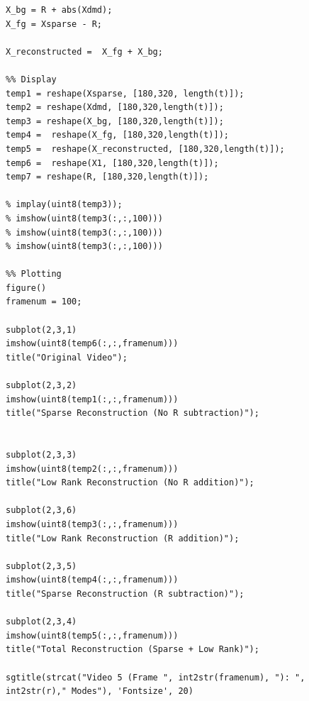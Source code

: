 \documentclass{article}
\begin{document}
\begin{lstlisting}[style=Matlab-editor]
X_bg = R + abs(Xdmd);
X_fg = Xsparse - R;

X_reconstructed =  X_fg + X_bg;

%% Display
temp1 = reshape(Xsparse, [180,320, length(t)]);
temp2 = reshape(Xdmd, [180,320,length(t)]);
temp3 = reshape(X_bg, [180,320,length(t)]);
temp4 =  reshape(X_fg, [180,320,length(t)]);
temp5 =  reshape(X_reconstructed, [180,320,length(t)]);
temp6 =  reshape(X1, [180,320,length(t)]);
temp7 = reshape(R, [180,320,length(t)]);

% implay(uint8(temp3));
% imshow(uint8(temp3(:,:,100)))
% imshow(uint8(temp3(:,:,100)))
% imshow(uint8(temp3(:,:,100)))

%% Plotting
figure()
framenum = 100;

subplot(2,3,1)
imshow(uint8(temp6(:,:,framenum)))
title("Original Video");

subplot(2,3,2)
imshow(uint8(temp1(:,:,framenum)))
title("Sparse Reconstruction (No R subtraction)");


subplot(2,3,3)
imshow(uint8(temp2(:,:,framenum)))
title("Low Rank Reconstruction (No R addition)");

subplot(2,3,6)
imshow(uint8(temp3(:,:,framenum)))
title("Low Rank Reconstruction (R addition)");

subplot(2,3,5)
imshow(uint8(temp4(:,:,framenum)))
title("Sparse Reconstruction (R subtraction)");

subplot(2,3,4)
imshow(uint8(temp5(:,:,framenum)))
title("Total Reconstruction (Sparse + Low Rank)");

sgtitle(strcat("Video 5 (Frame ", int2str(framenum), "): ", int2str(r)," Modes"), 'Fontsize', 20)
\end{lstlisting}
\end{document}
